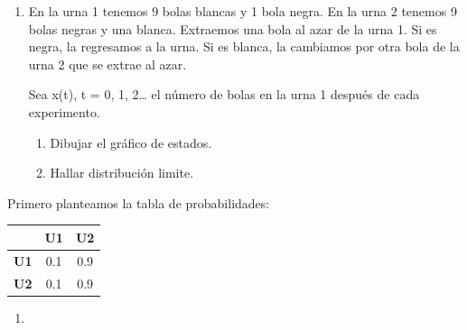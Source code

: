 \documentclass{templateNote}
\begin{document}
\begin{enumerate}[resume, start=11]


    \newpage
    \item En la urna 1 tenemos 9 bolas blancas y 1 bola negra. En la urna 2 tenemos 9 bolas
    negras y una blanca. Extraemos una bola al azar de la urna 1. Si es negra, la regresamos a
    la urna. Si es blanca, la cambiamos por otra bola de la urna 2 que se extrae al azar. 

    Sea x(t), t = 0, 1, 2… el número de bolas en la urna 1 después de cada experimento. 

    \begin{enumerate}[label=\alph*)]
        \item Dibujar el gráfico de estados.
        \item Hallar distribución limite.
    \end{enumerate}

\end{enumerate}

Primero planteamos la tabla de probabilidades:
\begin{table}[H]
    \centering
    \begin{tabular}{|c|c|c|}
        \hline
        & \textbf{U1} & \textbf{U2} \\ \hline
        \textbf{U1} & 0.1 & 0.9 \\ 
        \textbf{U2} & 0.1 & 0.9 \\ \hline
    \end{tabular}
\end{table}

\begin{enumerate}[label=\alph*)]
    \item 
\end{enumerate}
\end{document}
